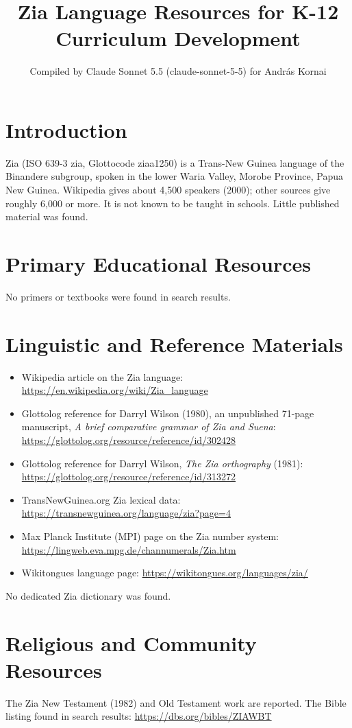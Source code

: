\documentclass[12pt]{article}
\title{Zia Language Resources for K-12 Curriculum Development}
\author{Compiled by Claude Sonnet 5.5 (claude-sonnet-5-5) for Andr\'as Kornai}
\date{}
\begin{document}
\maketitle

\section{Introduction}
Zia (ISO 639-3 zia, Glottocode ziaa1250) is a Trans-New Guinea language of the Binandere subgroup, spoken in the lower Waria Valley, Morobe Province, Papua New Guinea. Wikipedia gives about 4,500 speakers (2000); other sources give roughly 6,000 or more. It is not known to be taught in schools. Little published material was found.

\section{Primary Educational Resources}
No primers or textbooks were found in search results.

\section{Linguistic and Reference Materials}
\begin{itemize}
\item Wikipedia article on the Zia language: \url{https://en.wikipedia.org/wiki/Zia_language}
\item Glottolog reference for Darryl Wilson (1980), an unpublished 71-page manuscript, \emph{A brief comparative grammar of Zia and Suena}: \url{https://glottolog.org/resource/reference/id/302428}
\item Glottolog reference for Darryl Wilson, \emph{The Zia orthography} (1981): \url{https://glottolog.org/resource/reference/id/313272}
\item TransNewGuinea.org Zia lexical data: \url{https://transnewguinea.org/language/zia?page=4}
\item Max Planck Institute (MPI) page on the Zia number system: \url{https://lingweb.eva.mpg.de/channumerals/Zia.htm}
\item Wikitongues language page: \url{https://wikitongues.org/languages/zia/}
\end{itemize}
No dedicated Zia dictionary was found.

\section{Religious and Community Resources}
The Zia New Testament (1982) and Old Testament work are reported. The Bible listing found in search results: \url{https://dbs.org/bibles/ZIAWBT}
\end{document}
